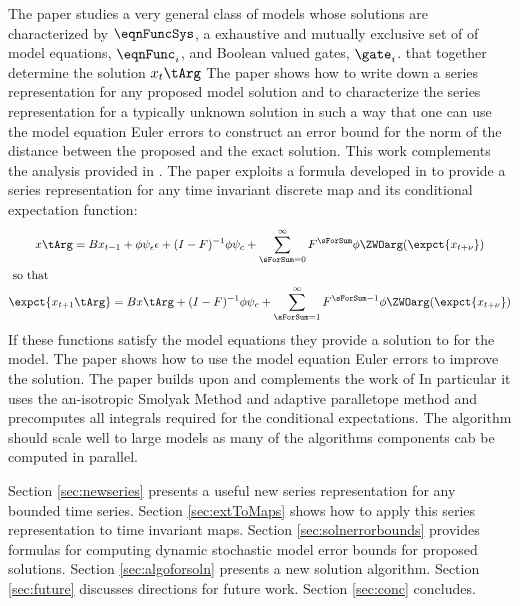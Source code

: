 \documentclass[12pt]{article}
\begin{document}
The paper studies a very general class of models whose 
solutions are characterized by $\eqnFuncSys$, a 
 exhaustive and mutually exclusive set of
of   model equations, $\eqnFunc_i$,  and Boolean valued gates, $\gate_i$. 
that together determine the solution  $x_t\tArg$
The paper shows how to write down a series representation for any proposed
model solution and to characterize the series representation for a typically
unknown solution in such a way that one can use the model equation Euler errors to construct an error bound for the norm of the distance between the proposed and the exact solution.  This work complements the analysis provided in
\cite{judd2017lower,peralta-alva14,santos2005accuracy,Santos2000accuracy}. 
The paper exploits a formula developed in \citep{anderson10} to provide a
series representation for any time invariant discrete map and its
conditional expectation function:
    \begin{gather*}
      	 x\tArg =B x_{t-1}+ \phi \psi_\epsilon\epsilon + (I - F)^{-1} \phi \psi_c + \sum_{\sForSum=0}^\infty F^\sForSum \phi \ZWOarg(\expct{x_{t+\nu}})\\ \intertext{ so that}
\expct{ x_{t+1}\tArg} =B x\tArg  + (I - F)^{-1} \phi \psi_c+ \sum_{\sForSum =1}^\infty F^{\sForSum-1} \phi \ZWOarg(\expct{x_{t+\nu}}) 
    \end{gather*}
 If these functions satisfy the model equations they provide a solution to for the model. The paper shows how to use the model equation Euler errors to 
 improve the solution.
The paper builds upon and complements the work of
\cite{Judd2014,juddGSSA2011,holden15:_exist_dsge,guerrieri15:_occbin}
In particular it uses
the an-isotropic Smolyak Method and adaptive paralletope method\cite{Judd2014}
and precomputes all integrals required for the conditional expectations.
The algorithm should scale well to large models as many 
of the algorithms components cab be computed in parallel.









Section \ref{sec:newseries} presents a useful new series representation for any bounded time series.
Section \ref{sec:extToMaps} shows how to apply this series representation to time invariant maps.
Section \ref{sec:solnerrorbounds} provides formulas for computing dynamic stochastic model error bounds for proposed  solutions.
Section \ref{sec:algoforsoln} presents a new solution algorithm.
Section \ref{sec:future} discusses directions for future work.
Section \ref{sec:conc} concludes.
\end{document}

